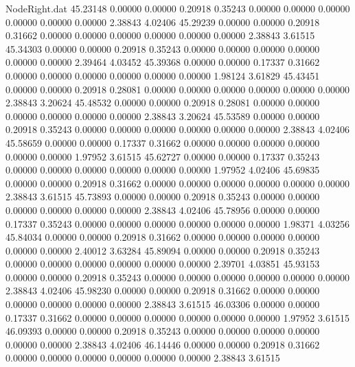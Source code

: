 \begin{filecontents}{NodeRight.dat}
  45.23148    0.00000    0.00000     0.20918    0.35243    0.00000    0.00000    0.00000    0.00000    0.00000    0.00000    2.38843    4.02406
  45.29239    0.00000    0.00000     0.20918    0.31662    0.00000    0.00000    0.00000    0.00000    0.00000    0.00000    2.38843    3.61515
  45.34303    0.00000    0.00000     0.20918    0.35243    0.00000    0.00000    0.00000    0.00000    0.00000    0.00000    2.39464    4.03452
  45.39368    0.00000    0.00000     0.17337    0.31662    0.00000    0.00000    0.00000    0.00000    0.00000    0.00000    1.98124    3.61829
  45.43451    0.00000    0.00000     0.20918    0.28081    0.00000    0.00000    0.00000    0.00000    0.00000    0.00000    2.38843    3.20624
  45.48532    0.00000    0.00000     0.20918    0.28081    0.00000    0.00000    0.00000    0.00000    0.00000    0.00000    2.38843    3.20624
  45.53589    0.00000    0.00000     0.20918    0.35243    0.00000    0.00000    0.00000    0.00000    0.00000    0.00000    2.38843    4.02406
  45.58659    0.00000    0.00000     0.17337    0.31662    0.00000    0.00000    0.00000    0.00000    0.00000    0.00000    1.97952    3.61515
  45.62727    0.00000    0.00000     0.17337    0.35243    0.00000    0.00000    0.00000    0.00000    0.00000    0.00000    1.97952    4.02406
  45.69835    0.00000    0.00000     0.20918    0.31662    0.00000    0.00000    0.00000    0.00000    0.00000    0.00000    2.38843    3.61515
  45.73893    0.00000    0.00000     0.20918    0.35243    0.00000    0.00000    0.00000    0.00000    0.00000    0.00000    2.38843    4.02406
  45.78956    0.00000    0.00000     0.17337    0.35243    0.00000    0.00000    0.00000    0.00000    0.00000    0.00000    1.98371    4.03256
  45.84034    0.00000    0.00000     0.20918    0.31662    0.00000    0.00000    0.00000    0.00000    0.00000    0.00000    2.40012    3.63284
  45.89094    0.00000    0.00000     0.20918    0.35243    0.00000    0.00000    0.00000    0.00000    0.00000    0.00000    2.39701    4.03851
  45.93153    0.00000    0.00000     0.20918    0.35243    0.00000    0.00000    0.00000    0.00000    0.00000    0.00000    2.38843    4.02406
  45.98230    0.00000    0.00000     0.20918    0.31662    0.00000    0.00000    0.00000    0.00000    0.00000    0.00000    2.38843    3.61515
  46.03306    0.00000    0.00000     0.17337    0.31662    0.00000    0.00000    0.00000    0.00000    0.00000    0.00000    1.97952    3.61515
  46.09393    0.00000    0.00000     0.20918    0.35243    0.00000    0.00000    0.00000    0.00000    0.00000    0.00000    2.38843    4.02406
  46.14446    0.00000    0.00000     0.20918    0.31662    0.00000    0.00000    0.00000    0.00000    0.00000    0.00000    2.38843    3.61515

\end{filecontents}
